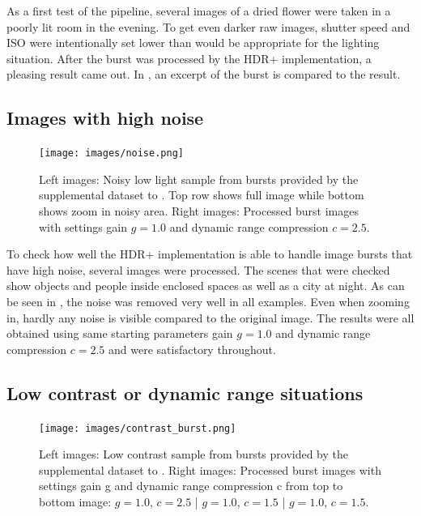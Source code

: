 \documentclass{egpubl}
\begin{document}
As a first test of the pipeline, several images of a dried flower 
were taken in a poorly lit room in the evening. To get even darker 
raw images, shutter speed and ISO were intentionally set lower than 
would be appropriate for the lighting situation. After the burst was
processed by the HDR+ implementation, a pleasing result came out. 
In , an excerpt of the burst is compared to the result.


\subsection{Images with high noise}
\label{sec:noise}

\begin{figure}
      \hspace{\fill}
      \texttt{[image: images/noise.png]}
      \hspace{\fill}
      \centering
      \caption{
            Left images: Noisy low light sample from bursts provided by the supplemental dataset
            to \cite{Hasinoff2016burst}. Top row shows full image while bottom shows zoom in noisy
            area.
            Right images: Processed burst images with settings gain $g=1.0$ and dynamic 
            range compression $c=2.5$.
      }
      \label{fig:noise}
\end{figure}

To check how well the HDR+ implementation is able to handle image bursts that have high noise, several 
images were processed. The scenes that were checked show objects and people inside enclosed 
spaces as well as a city at night. As can be seen in , the noise was 
removed very well in all examples. Even when zooming in, hardly any noise is visible 
compared to the original image. The results were all obtained using same starting 
parameters gain $g=1.0$ and dynamic range compression $c=2.5$ and were satisfactory throughout.



\subsection{Low contrast or dynamic range situations}
\label{sec:contrast}

\begin{figure}
      \hspace{\fill}
      \texttt{[image: images/contrast\_burst.png]}
      \hspace{\fill}
      \centering
      \caption{
            Left images: Low contrast sample from bursts provided by the supplemental dataset
            to \cite{Hasinoff2016burst}.
            Right images: Processed burst images with settings gain g and dynamic 
            range compression c from top to bottom image: $g=1.0$, $c=2.5$ | $g=1.0$, $c=1.5$ | $g=1.0$, $c=1.5$.
      }
      \label{fig:contrast}
\end{figure}
\end{document}
